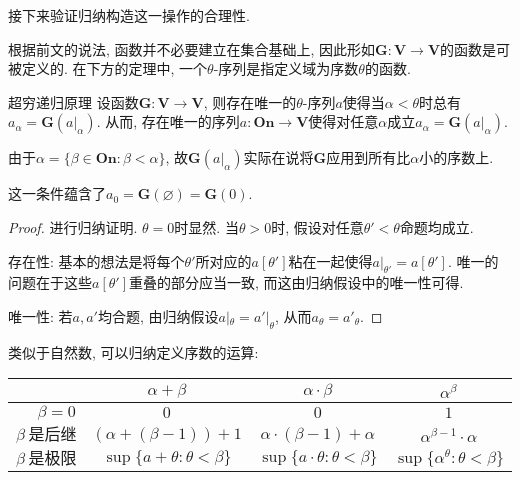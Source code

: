 接下来验证归纳构造这一操作的合理性. 

根据前文的说法, 函数并不必要建立在集合基础上, 因此形如$\mathbf{G}:\mathbf{V} \to \mathbf{V}$的函数是可被定义的. 在下方的定理中, 一个$\theta$-序列是指定义域为序数$\theta$的函数. 

\begin{corollary}{超穷递归原理}
	设函数$\mathbf{G}:\mathbf{V} \to \mathbf{V}$, 则存在唯一的$\theta$-序列$a$使得当$\alpha < \theta$时总有$a_{\alpha} = \mathbf{G}(a|_{\alpha})$. 从而, 存在唯一的序列$a:\mathbf{On} \to \mathbf{V}$使得对任意$\alpha$成立$a_{\alpha} = \mathbf{G}(a|_{\alpha})$. 
\end{corollary}
\begin{remark}
	由于$\alpha = \{ \beta \in \mathbf{On}:\beta < \alpha \}$, 故$\mathbf{G}(a|_{\alpha})$实际在说将$\mathbf{G}$应用到所有比$\alpha$小的序数上. 
\end{remark}
\begin{remark}
	这一条件蕴含了$a_0=\mathbf{G}(\varnothing) = \mathbf{G}(0)$. 
\end{remark}
\begin{proof}
	进行归纳证明. $\theta =0$时显然. 当$\theta >0$时, 假设对任意$\theta ' < \theta$命题均成立. 
	
	存在性: 基本的想法是将每个$\theta '$所对应的$a[\theta ']$粘在一起使得$a|_{\theta '} = a[\theta ']$. 唯一的问题在于这些$a[\theta ']$重叠的部分应当一致, 而这由归纳假设中的唯一性可得. 
	
	唯一性: 若$a,a'$均合题, 由归纳假设$a|_{\theta}=a'|_{\theta}$, 从而$a_{\theta} = a'_{\theta}$. 
\end{proof}

类似于自然数, 可以归纳定义序数的运算: 


\begin{table}[h]
	\centering
	\renewcommand\arraystretch{1.4}
\begin{tabular}{rccc}
\toprule
                        & $\alpha + \beta$                       & $\alpha \cdot \beta$                         & $\alpha ^{\beta}$                            \\
\midrule
$\beta = 0$             & $0$                                    & $0$                                          & $1$                                          \\
$\beta ~\textit{是后继序数}$ & $(\alpha+(\beta -1))+1$                & $\alpha \cdot (\beta -1) + \alpha$           & $\alpha ^{\beta -1} \cdot \alpha$            \\
$\beta ~\textit{是极限序数}$ & $\sup \{ a+\theta : \theta < \beta \}$ & $\sup \{ a \cdot \theta : \theta < \beta \}$ & $\sup \{ \alpha ^{\theta}:\theta < \beta \}$ \\
\bottomrule
\end{tabular}
\end{table}

